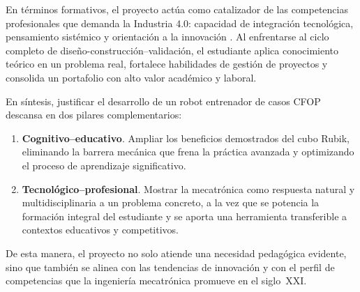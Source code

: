En términos formativos, el proyecto actúa como catalizador de las competencias profesionales que demanda la Industria 4.0: capacidad de integración tecnológica, pensamiento sistémico y orientación a la innovación \cite{AquinoRobles2019}.  Al enfrentarse al ciclo completo de diseño-construcción–validación, el estudiante aplica conocimiento teórico en un problema real, fortalece habilidades de gestión de proyectos y consolida un portafolio con alto valor académico y laboral.

En síntesis, justificar el desarrollo de un robot entrenador de casos CFOP descansa en dos pilares complementarios:  
\begin{enumerate}
    \item \textbf{Cognitivo–educativo}. Ampliar los beneficios demostrados del cubo Rubik, eliminando la barrera mecánica que frena la práctica avanzada y optimizando el proceso de aprendizaje significativo.  
    \item \textbf{Tecnológico–profesional}. Mostrar la mecatrónica como respuesta natural y multidisciplinaria a un problema concreto, a la vez que se potencia la formación integral del estudiante y se aporta una herramienta transferible a contextos educativos y competitivos.  
  \end{enumerate}

De esta manera, el proyecto no solo atiende una necesidad pedagógica evidente, sino que también se alinea con las tendencias de innovación y con el perfil de competencias que la ingeniería mecatrónica promueve en el siglo XXI.